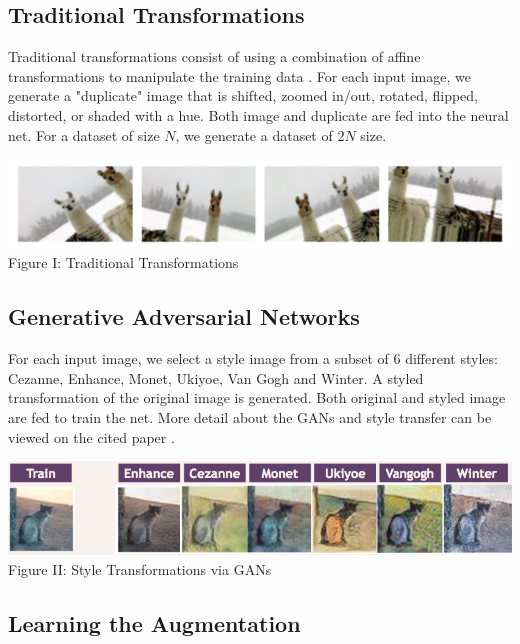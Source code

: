 \documentclass[10pt,twocolumn,letterpaper]{article}
\begin{document}
\subsection{Traditional Transformations}

Traditional transformations consist of using a combination of affine transformations to manipulate the training data \cite{smiles}. For each input image, we generate a "duplicate" image that is shifted, zoomed in/out, rotated, flipped, distorted, or shaded with a hue. Both image and duplicate are fed into the neural net. For a dataset of size $N$, we generate a dataset of $2N$ size. 

\begin{center}
\includegraphics[scale=0.4]{simpleTransform.png}
Figure I: Traditional Transformations
\end{center}

\subsection{Generative Adversarial Networks}

For each input image, we select a style image from a subset of 6 different styles: Cezanne, Enhance, Monet, Ukiyoe, Van Gogh and Winter. A styled transformation of the original image is generated. Both original and styled image are fed to train the net. More detail about the GANs and style transfer can be viewed on the cited paper \cite{cyclegan}. 

\begin{center}
\includegraphics[scale=0.52]{gans}
Figure II: Style Transformations via GANs
\end{center}

\subsection{Learning the Augmentation}
\end{document}
